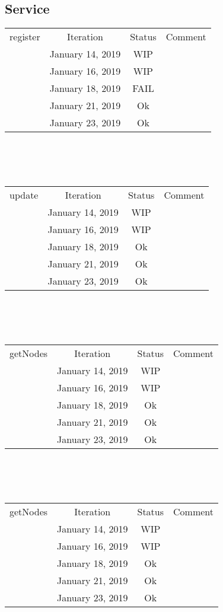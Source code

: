 \documentclass{scrreprt}
\begin{document}
\subsection{Service}
	\begin{tabularx}{12cm}{X|c|c|c}
		register & Iteration & Status & Comment  \\
		& January 14, 2019 & WIP & \\
		& January 16, 2019 & WIP & \\
		& January 18, 2019 & FAIL & \\
		& January 21, 2019 & Ok & \\
		& January 23, 2019 & Ok & \\
	\end{tabularx}	
	\\ \\ \\
	\begin{tabularx}{12cm}{X|c|c|c}
		update & Iteration & Status & Comment  \\
		& January 14, 2019 & WIP & \\
		& January 16, 2019 & WIP & \\
		& January 18, 2019 & Ok & \\
		& January 21, 2019 & Ok & \\
		& January 23, 2019 & Ok & \\
	\end{tabularx}	
	\\ \\ \\
	\begin{tabularx}{12cm}{X|c|c|c}
		getNodes & Iteration & Status & Comment  \\
		& January 14, 2019 & WIP & \\
		& January 16, 2019 & WIP & \\
		& January 18, 2019 & Ok & \\
		& January 21, 2019 & Ok & \\
		& January 23, 2019 & Ok & \\
	\end{tabularx}	
	\\ \\ \\
	\begin{tabularx}{12cm}{X|c|c|c}
		getNodes & Iteration & Status & Comment  \\
		& January 14, 2019 & WIP & \\
		& January 16, 2019 & WIP & \\
		& January 18, 2019 & Ok & \\
		& January 21, 2019 & Ok & \\
		& January 23, 2019 & Ok & \\
	\end{tabularx}	
\end{document}
